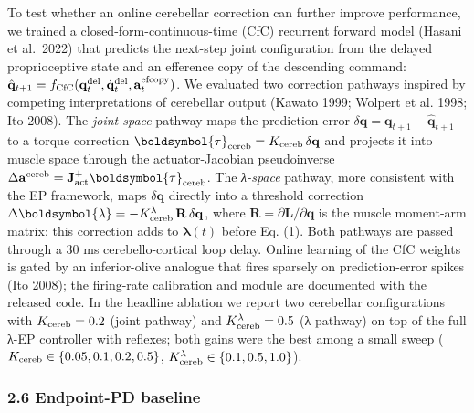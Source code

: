 \documentclass[
  11pt,
]{article}
\begin{document}
To test whether an online cerebellar correction can further improve
performance, we trained a closed-form-continuous-time (CfC) recurrent
forward model (Hasani et al.~2022) that predicts the next-step joint
configuration from the delayed proprioceptive state and an efference
copy of the descending command:
\(\hat{\mathbf{q}}_{t+1} = f_{\rm CfC}(\mathbf{q}^{\rm del}_{t}, \dot{\mathbf{q}}^{\rm del}_{t}, \mathbf{a}^{\rm efcopy}_{t})\).
We evaluated two correction pathways inspired by competing
interpretations of cerebellar output (Kawato 1999; Wolpert et al. 1998;
Ito 2008). The \emph{joint-space} pathway maps the prediction error
\(\delta\mathbf{q} = \mathbf{q}_{t+1}-\hat{\mathbf{q}}_{t+1}\) to a
torque correction
\(\boldsymbol{\tau}_{\rm cereb} = K_{\rm cereb}\,\delta\mathbf{q}\) and
projects it into muscle space through the actuator-Jacobian
pseudoinverse
\(\Delta\mathbf{a}^{\rm cereb} = \mathbf{J}_{\rm act}^{+}\boldsymbol{\tau}_{\rm cereb}\).
The \emph{λ-space} pathway, more consistent with the EP framework, maps
\(\delta\mathbf{q}\) directly into a threshold correction
\(\Delta\boldsymbol{\lambda} = -K_{\rm cereb}^{\lambda}\,\mathbf{R}\,\delta\mathbf{q}\),
where \(\mathbf{R} = \partial \mathbf{L}/\partial \mathbf{q}\) is the
muscle moment-arm matrix; this correction adds to
\(\boldsymbol{\lambda}(t)\) before Eq. (1). Both pathways are passed
through a 30 ms cerebello-cortical loop delay. Online learning of the
CfC weights is gated by an inferior-olive analogue that fires sparsely
on prediction-error spikes (Ito 2008); the firing-rate calibration and
module are documented with the released code. In the headline ablation
we report two cerebellar configurations with \(K_{\rm cereb} = 0.2\)
(joint pathway) and \(K_{\rm cereb}^{\lambda} = 0.5\) (λ pathway) on top
of the full λ-EP controller with reflexes; both gains were the best
among a small sweep (\(K_{\rm cereb}\in\{0.05,0.1,0.2,0.5\}\),
\(K_{\rm cereb}^{\lambda}\in\{0.1,0.5,1.0\}\)).

\hypertarget{endpoint-pd-baseline}{%
\subsubsection{2.6 Endpoint-PD baseline}\label{endpoint-pd-baseline}}
\end{document}
